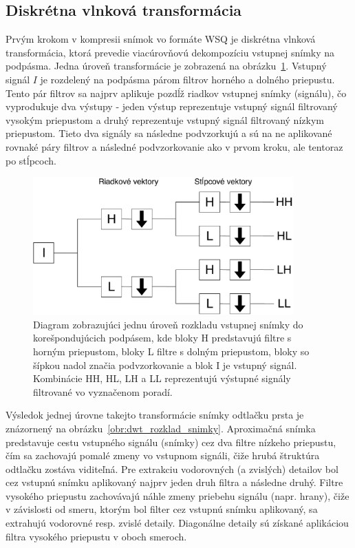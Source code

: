   \subsection{Diskrétna vlnková transformácia}
  Prvým krokom v kompresii snímok vo formáte WSQ je diskrétna vlnková transformácia, ktorá prevedie viacúrovňovú dekompozíciu vstupnej snímky na 
  podpásma. Jedna úroveň transformácie je zobrazená na obrázku~{\ref{obr:DWT_uroven}}. Vstupný signál $I$ je rozdelený na podpásma párom filtrov horného
  a dolného priepustu. Tento pár filtrov sa najprv aplikuje pozdĺž riadkov vstupnej snímky (signálu), čo vyprodukuje dva výstupy - jeden výstup reprezentuje
  vstupný signál filtrovaný vysokým priepustom a druhý reprezentuje vstupný signál filtrovaný nízkym priepustom. Tieto dva signály sa následne podvzorkujú
  a sú na ne aplikované rovnaké páry filtrov a následné podvzorkovanie ako v prvom kroku, ale tentoraz po stĺpcoch.

  \begin{figure}[h]
    \centering
    \includegraphics[width=10cm]{obrazky-figures/DWT_level.pdf}
    \caption{Diagram zobrazujúci jednu úroveň rozkladu vstupnej snímky do korešpondujúcich podpásem, kde bloky H predstavujú filtre s horným priepustom,
    bloky L filtre s dolným priepustom, bloky so šípkou nadol značia podvzorkovanie a blok I je vstupný signál. Kombinácie HH, HL, LH a LL reprezentujú
    výstupné signály filtrované vo vyznačenom poradí.}
    \label{obr:DWT_uroven}
  \end{figure}

  Výsledok jednej úrovne takejto transformácie snímky odtlačku prsta je znázornený na obrázku~{\ref{obr:dwt_rozklad_snimky}}. Aproximačná snímka predstavuje
  cestu vstupného signálu (snímky) cez dva filtre nízkeho priepustu, čím sa zachovajú pomalé zmeny vo vstupnom signáli, čiže hrubá štruktúra odtlačku zostáva
  viditeľná. Pre extrakciu vodorovných (a zvislých) detailov bol cez vstupnú snímku aplikovaný najprv jeden druh filtra a následne druhý. Filtre vysokého
  priepustu zachovávajú náhle zmeny priebehu signálu (napr. hrany), čiže v závislosti od smeru, ktorým bol filter cez vstupnú snímku aplikovaný,
  sa extrahujú vodorovné resp. zvislé detaily. Diagonálne detaily sú získané aplikáciou filtra vysokého priepustu v oboch smeroch.

